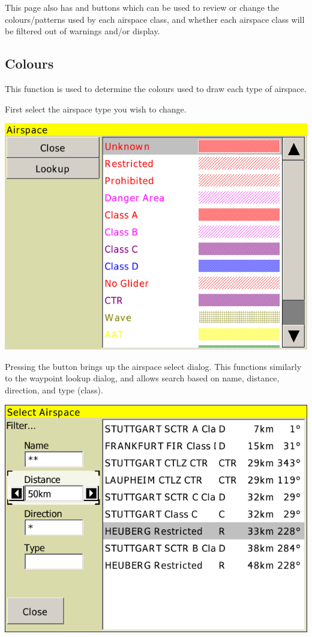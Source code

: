 This page also has  and  buttons which
can be used to review or change the colours/patterns used by each
airspace class, and whether each airspace class will be filtered out
of warnings and/or display.  

\subsection*{Colours}
This function is used to determine the colours used to draw each type of
airspace.

First select the airspace type you wish to change.

\begin{center}
\includegraphics[angle=0,width=0.8\linewidth,keepaspectratio='true']{figures/config-airspacecolors.png}
\end{center}

Pressing the  button brings up the airspace select dialog.
This functions similarly to the waypoint lookup dialog, and allows
search based on name, distance, direction, and type (class).  

\begin{center}
\includegraphics[angle=0,width=0.8\linewidth,keepaspectratio='true']{figures/airspacelookup.png}
\end{center}

